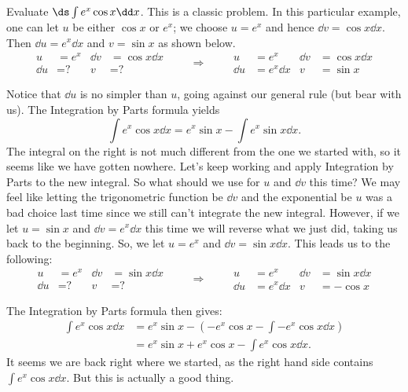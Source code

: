 \begin{example}\label{ex_ibp4}
Evaluate $\ds\int e^x\cos x\dd x$.
\solution
This is a classic problem.
In this particular example, one can let $u$ be either $\cos x$ or $e^x$;
we choose $u=e^x$ and hence $\dd v = \cos x\dd x$.  Then $\dd u=e^x\dd x$ and $v=\sin x$ as shown below.
\[
\begin{aligned}
u&= e^x & \dd v&=\cos x\dd x\\
\dd u&= \text{?} & v&=\text{?}
\end{aligned}
\qquad\Rightarrow\qquad
\begin{aligned}
u&= e^x& \dd v&=\cos x\dd x\\
\dd u&= e^x\dd x & v&=\sin x
\end{aligned}
\]

Notice that $\dd u$ is no simpler than $u$, going against our general rule (but bear with us). The Integration by Parts formula yields
\[\int e^x\cos x\dd x = e^x\sin x - \int e^x\sin x\dd x.\]
The integral on the right is not much different from the one we started with, so it seems like we have gotten nowhere. Let's keep working and apply Integration by Parts to the new integral. So what should we use for $u$ and $\dd v$ this time? We may feel like letting the trigonometric function be $\dd v$ and the exponential be $u$ was a bad choice last time since we still can't integrate the new integral. However, if we let $u=\sin x$ and $\dd v=e^x\dd x$ this time we will reverse what we just did, taking us back to the beginning. So, we let $u=e^x$ and $\dd v = \sin x\dd x$. This leads us to the following:
\[
\begin{aligned}
u&= e^x & \dd v&=\sin x\dd x\\
\dd u&= \text{?} & v&=\text{?}
\end{aligned}
\qquad\Rightarrow\qquad
\begin{aligned}
u&= e^x& \dd v&=\sin x\dd x\\
\dd u&= e^x\dd x & v&=-\cos x
\end{aligned}
\]

The Integration by Parts formula then gives:
\begin{align*}
 \int e^x\cos x\dd x
 &= e^x\sin x - \left(-e^x\cos x - \int -e^x\cos x\dd x\right)\\
 &= e^x\sin x+ e^x\cos x - \int e^x\cos x\dd x.
\end{align*}
It seems we are back right where we started, as the right hand side contains $\int e^x\cos x\dd x$.  But this is actually a good thing.  


\end{example}
